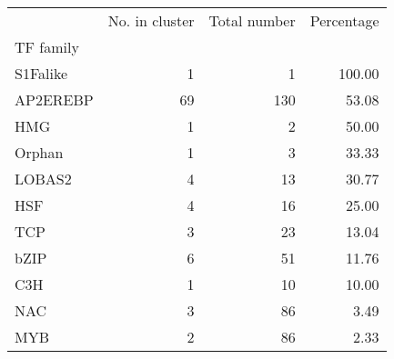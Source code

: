 \begin{tabular}{lrrr}
\toprule
{} &  No. in cluster &  Total number &  Percentage \\
TF family &                 &               &             \\
\midrule
S1Falike  &               1 &             1 &      100.00 \\
AP2EREBP  &              69 &           130 &       53.08 \\
HMG       &               1 &             2 &       50.00 \\
Orphan    &               1 &             3 &       33.33 \\
LOBAS2    &               4 &            13 &       30.77 \\
HSF       &               4 &            16 &       25.00 \\
TCP       &               3 &            23 &       13.04 \\
bZIP      &               6 &            51 &       11.76 \\
C3H       &               1 &            10 &       10.00 \\
NAC       &               3 &            86 &        3.49 \\
MYB       &               2 &            86 &        2.33 \\
\bottomrule
\end{tabular}

